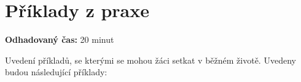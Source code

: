 \documentclass[12pt,a4paper,addpoints]{article}
\begin{document}
    \newpage



    \section{Příklady z praxe}
    \textbf{Odhadovaný čas:} 20 minut

    Uvedení příkladů, se kterými se mohou žáci setkat v běžném životě. Uvedeny budou
    následující příklady:
\end{document}
